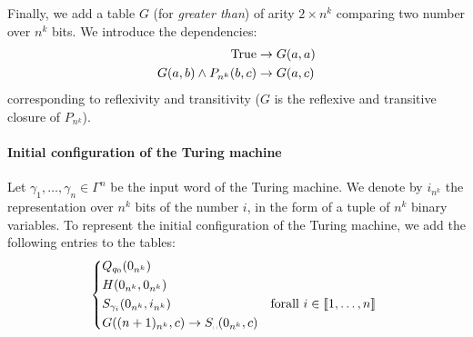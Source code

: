 \documentclass{../../cs-classes/cs-classes}
\begin{document}
\begin{exercise}
    Finally, we add a table $G$ (for \emph{greater than}) of arity $2\times n^k$ comparing two number over $n^k$ bits. We introduce the dependencies:
    \begin{equation*}
        \begin{aligned}
            \textnormal{True}           & \rightarrow G(a, a) \\
            G(a, b) \land P_{n^k}(b, c) & \rightarrow G(a, c)
        \end{aligned}
    \end{equation*}
    corresponding to reflexivity and transitivity ($G$ is the reflexive and transitive closure of $P_{n^k}$).

    \paragraph*{Initial configuration of the Turing machine}
    Let $\gamma_1, \dots, \gamma_n \in \Gamma^n$ be the input word of the Turing machine.
    We denote by $i_{n^k}$ the representation over $n^k$ bits of the number $i$, in the form of a tuple of $n^k$ binary variables. To represent the initial configuration of the Turing machine, we add the following entries to the tables:
    \begin{equation*}
        \begin{cases*}
            Q_{q_0}(0_{n^k})                                                              \\
            H(0_{n^k}, 0_{n^k})                                                           \\
            S_{\gamma_i}(0_{n^k}, i_{n^k}) & forall $i\in\llbracket1, \dots, n\rrbracket$ \\
            G((n+1)_{n^k}, c) \rightarrow S_{\textnormal{\textvisiblespace}}(0_{n^k}, c)
        \end{cases*}
    \end{equation*}


\end{exercise}
\end{document}
